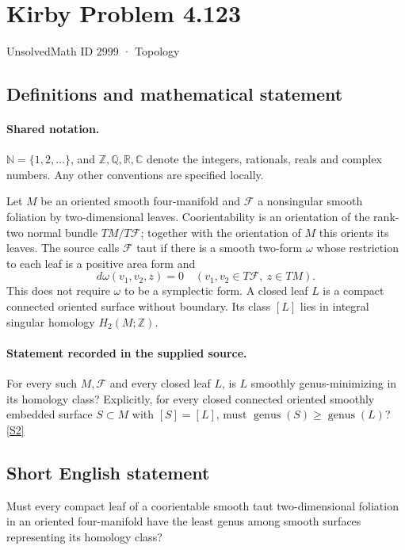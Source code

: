 \documentclass[11pt]{article}
\newcommand{\sref}[2]{\hyperlink{source:#1:#2}{[S#2]}}
\begin{document}
\setcounter{section}{2998}
\section{Kirby Problem 4.123}\label{2999}
{\small\sffamily UnsolvedMath ID 2999 · Topology}
\subsection{Definitions and mathematical statement}

\paragraph{Shared notation.}$\mathbb N=\{1,2,\ldots\}$, and $\mathbb Z,\mathbb Q,\mathbb R,\mathbb C$ denote the integers, rationals, reals and complex numbers. Any other conventions are specified locally.


Let $M$ be an oriented smooth four-manifold and $\mathcal F$ a nonsingular smooth foliation by two-dimensional leaves. Coorientability is an orientation of the rank-two normal bundle $TM/T\mathcal F$; together with the orientation of $M$ this orients its leaves. The source calls $\mathcal F$ taut if there is a smooth two-form $\omega$ whose restriction to each leaf is a positive area form and
\[
 d\omega(v_1,v_2,z)=0
 \quad(v_1,v_2\in T\mathcal F,\ z\in TM).
\]
This does not require $\omega$ to be a symplectic form. A closed leaf $L$ is a compact connected oriented surface without boundary. Its class $[L]$ lies in integral singular homology $H_2(M;\mathbb Z)$.
\paragraph{Statement recorded in the supplied source.}
For every such $M,\mathcal F$ and every closed leaf $L$, is $L$ smoothly genus-minimizing in its homology class? Explicitly, for every closed connected oriented smoothly embedded surface $S\subset M$ with $[S]=[L]$, must $\operatorname{genus}(S)\geq\operatorname{genus}(L)$? \sref{2999}{2}
\subsection{Short English statement}
Must every compact leaf of a coorientable smooth taut two-dimensional foliation in an oriented four-manifold have the least genus among smooth surfaces representing its homology class?
\end{document}
